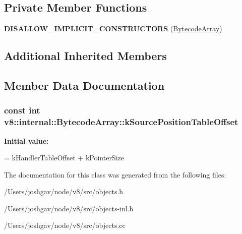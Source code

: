 \subsection*{Private Member Functions}
\begin{DoxyCompactItemize}
\item 
{\bfseries D\+I\+S\+A\+L\+L\+O\+W\+\_\+\+I\+M\+P\+L\+I\+C\+I\+T\+\_\+\+C\+O\+N\+S\+T\+R\+U\+C\+T\+O\+RS} (\hyperlink{classv8_1_1internal_1_1_bytecode_array}{Bytecode\+Array})\hypertarget{classv8_1_1internal_1_1_bytecode_array_a820c12f24e0352a1bb1017c7ae8a419a}{}\label{classv8_1_1internal_1_1_bytecode_array_a820c12f24e0352a1bb1017c7ae8a419a}

\end{DoxyCompactItemize}
\subsection*{Additional Inherited Members}


\subsection{Member Data Documentation}
\subsubsection[{\texorpdfstring{k\+Source\+Position\+Table\+Offset}{kSourcePositionTableOffset}}]{\setlength{\rightskip}{0pt plus 5cm}const int v8\+::internal\+::\+Bytecode\+Array\+::k\+Source\+Position\+Table\+Offset\hspace{0.3cm}{\ttfamily [static]}}\hypertarget{classv8_1_1internal_1_1_bytecode_array_a7c0c27ce7e062b82866a74e349af3d5e}{}\label{classv8_1_1internal_1_1_bytecode_array_a7c0c27ce7e062b82866a74e349af3d5e}
{\bfseries Initial value\+:}
\begin{DoxyCode}
=
      kHandlerTableOffset + kPointerSize
\end{DoxyCode}


The documentation for this class was generated from the following files\+:\begin{DoxyCompactItemize}
\item 
/\+Users/joshgav/node/v8/src/objects.\+h\item 
/\+Users/joshgav/node/v8/src/objects-\/inl.\+h\item 
/\+Users/joshgav/node/v8/src/objects.\+cc\end{DoxyCompactItemize}
